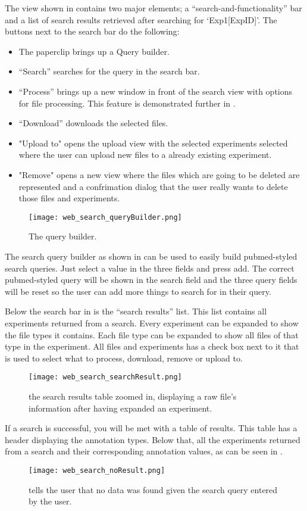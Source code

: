 The view shown in  contains two major elements; a “search-and-functionality” bar and a list of search results retrieved after searching for ‘Exp1[ExpID]’. The buttons next to the search bar do the following: 
\begin{itemize}
	\item The paperclip brings up a Query builder.
	\item “Search” searches for the query in the search bar. 
	\item “Process” brings up a new window in front of the search view with options for file processing. This feature is demonstrated further in .
    \item “Download” downloads the selected files. 
    \item "Upload to" opens the upload view with the selected experiments selected where the user can upload new files to a already existing experiment.
    \item "Remove" opens a new view where the files which are going to be deleted are represented and a confrimation dialog that the user really wants to delete those files and experiments.
\end{itemize}
\begin{figure}[h]
\centering
\texttt{[image: web\_search\_queryBuilder.png]}
\caption{\label{fig:web_search_queryBuilder}The query builder.}
\end{figure}
The search query builder as shown in  can be used to easily build pubmed-styled search queries. Just select a value in the three fields and press add. The correct pubmed-styled query will be shown in the search field and the three query fields will be reset so the user can add more things to search for in their query.

Below the search bar in  is the “search results” list. This list contains all experiments returned from a search. Every experiment can be expanded to show the file types it contains. Each file type can be expanded to show all files of that type in the experiment. All files and experiments has a check box next to it that is used to select what to process, download, remove or upload to.
\begin{figure}[h]
\centering
\texttt{[image: web\_search\_searchResult.png]}
\caption{\label{fig:web_search_searchResult}the search results table zoomed in, displaying a raw file’s information after having expanded an experiment.}
\end{figure}
\FloatBarrier
If a search is successful, you will be met with a table of results. This table has a header displaying the annotation types. Below that, all the experiments returned from a search and their corresponding annotation values, as can be seen in .
\begin{figure}[h]
\centering
\texttt{[image: web\_search\_noResult.png]}
\caption{\label{fig:web_search_noResult}tells the user that no data was found given the search query entered by the user.}
\end{figure}
\FloatBarrier

